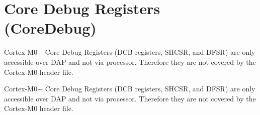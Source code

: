 \hypertarget{group___c_m_s_i_s___core_debug}{}\section{Core Debug Registers (Core\+Debug)}
\label{group___c_m_s_i_s___core_debug}


Cortex-\/\+M0+ Core Debug Registers (D\+C\+B registers, S\+H\+C\+S\+R, and D\+F\+S\+R) are only accessible over D\+A\+P and not via processor. Therefore they are not covered by the Cortex-\/\+M0 header file.  


Cortex-\/\+M0+ Core Debug Registers (D\+C\+B registers, S\+H\+C\+S\+R, and D\+F\+S\+R) are only accessible over D\+A\+P and not via processor. Therefore they are not covered by the Cortex-\/\+M0 header file. 

